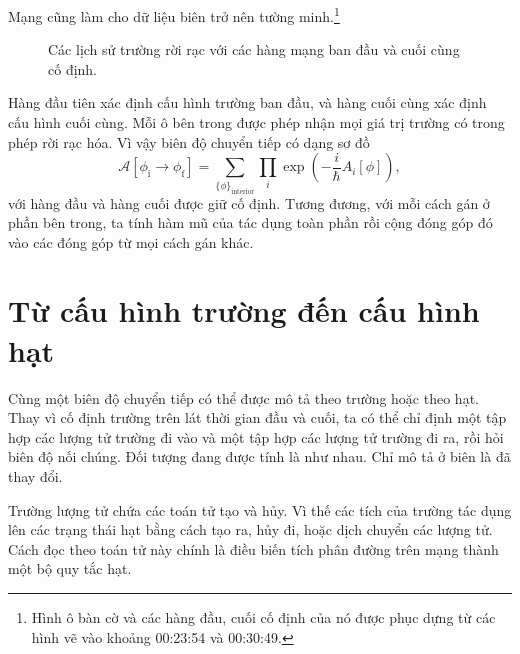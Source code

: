 Mạng cũng làm cho dữ liệu biên trở nên tường minh.\footnote{Hình ô bàn cờ và các hàng đầu, cuối cố định của nó được phục dựng từ các hình vẽ vào khoảng 00:23:54 và 00:30:49.}
\begin{figure}[htbp]
\centering
{}
\caption{Các lịch sử trường rời rạc với các hàng mạng ban đầu và cuối cùng cố định.}
\end{figure}

Hàng đầu tiên xác định cấu hình trường ban đầu, và hàng cuối cùng xác định cấu hình cuối cùng. Mỗi ô bên trong được phép nhận mọi giá trị trường có trong phép rời rạc hóa. Vì vậy biên độ chuyển tiếp có dạng sơ đồ
\begin{equation}
\mathcal{A}\!\left[\phi_{\mathrm{i}}\rightarrow\phi_{\mathrm{f}}\right]
=
\sum_{\{\phi\}_{\mathrm{interior}}}
\prod_i\exp\!\left(-\frac{i}{\hbar}A_i[\phi]\right),
\end{equation}
với hàng đầu và hàng cuối được giữ cố định. Tương đương, với mỗi cách gán ở phần bên trong, ta tính hàm mũ của tác dụng toàn phần rồi cộng đóng góp đó vào các đóng góp từ mọi cách gán khác.

\section{Từ cấu hình trường đến cấu hình hạt}

Cùng một biên độ chuyển tiếp có thể được mô tả theo trường hoặc theo hạt. Thay vì cố định trường trên lát thời gian đầu và cuối, ta có thể chỉ định một tập hợp các lượng tử trường đi vào và một tập hợp các lượng tử trường đi ra, rồi hỏi biên độ nối chúng. Đối tượng đang được tính là như nhau. Chỉ mô tả ở biên là đã thay đổi.

Trường lượng tử chứa các toán tử tạo và hủy. Vì thế các tích của trường tác dụng lên các trạng thái hạt bằng cách tạo ra, hủy đi, hoặc dịch chuyển các lượng tử. Cách đọc theo toán tử này chính là điều biến tích phân đường trên mạng thành một bộ quy tắc hạt.

